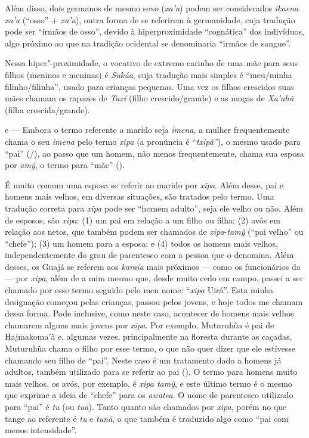 Além disso, dois germanos de mesmo sexo (\emph{xa'a}) podem ser
considerados \emph{ikaena} \emph{xa'a} (``osso'' + \emph{xa'a}), outra
forma de se referirem à germanidade, cuja tradução pode ser ``irmãos de
osso'', devido à hiperproximidade ``cognática'' dos indivíduos, algo
próximo ao que na tradição ocidental se denominaria ``irmãos de sangue''.

Nessa hiper"-proximidade, o vocativo de extremo carinho de uma mãe para
seus filhos (meninos e meninas) é \emph{Sukúa}, cuja tradução mais
simples é ``meu/minha filinho/filinha'', usado para crianças pequenas.
Uma vez os filhos crescidos suas mães chamam os rapazes de \emph{Taxí}
(filho crescido/grande) e as moças de \emph{Xa'ahũ} (filha
crescida/grande).

\emph{} e \emph{} --- Embora o termo referente a marido
seja \emph{imena}, a mulher frequentemente chama o seu \emph{imena} pelo
termo \emph{xipa} (a pronúncia é ``\emph{txipá''}), o mesmo usado para
``pai'' (/), ao passo que um homem, não menos frequentemente, chama
sua esposa por \emph{amỹ}, o termo para ``mãe'' ().

É muito comum uma esposa se referir ao marido por \emph{xipa}. Além
desse, pai e homens mais velhos, em diversas situações, são tratados
pelo termo. Uma tradução correta para \emph{xipa} pode ser ``homem
adulto'', seja ele velho ou não. Além de esposos, são \emph{xipa}: (1) um
pai em relação a um filho ou filha; (2) avôs em relação aos netos, que
também podem ser chamados de \emph{xipa}-\emph{tamỹ} (``pai velho'' ou
``chefe''); (3) um homem para a esposa; e (4) todos os homens mais velhos,
independentemente do grau de parentesco com a pessoa que o denomina.
Além desses, os Guajá se referem aos \emph{karaia} mais próximos --- como
os funcionários da  --- por \emph{xipa}, além de a mim mesmo que,
desde muito cedo em campo, passei a ser chamado por esse termo seguido
pelo meu nome: ``\emph{xipa} Uirá''. Esta minha designação começou pelas
crianças, passou pelos jovens, e hoje todos me chamam dessa forma. Pode
inclusive, como neste caso, acontecer de homens mais velhos chamarem
alguns mais jovens por \emph{xipa}. Por exemplo, Muturuhũa é pai de
Hajmakoma'ã e, algumas vezes, principalmente na floresta durante as
caçadas, Muturuhũa chama o filho por esse termo, o que não quer dizer
que ele estivesse chamando seu filho de ``pai''. Neste caso é um
tratamento dado a homens já adultos, também utilizado para se referir ao
pai (). O termo para homens muito mais velhos, os avós, por exemplo, é
\emph{xipa tamỹ}, e este último termo é o mesmo que exprime a ideia de
``chefe'' para os \emph{awatea}. O nome de parentesco utilizado para
``pai'' é \emph{tu} (ou \emph{tua}). Tanto  quanto  são chamados por
\emph{xipa}, porém no que tange ao referente  é \emph{tu} e 
\emph{tunã}, o que também é traduzido algo como ``pai com menos
intensidade''.

